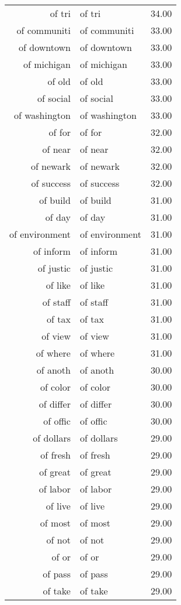 \begin{table}[ht]
\begin{tabular}{rlr}
  of tri & of tri & 34.00 \\ 
  of communiti & of communiti & 33.00 \\ 
  of downtown & of downtown & 33.00 \\ 
  of michigan & of michigan & 33.00 \\ 
  of old & of old & 33.00 \\ 
  of social & of social & 33.00 \\ 
  of washington & of washington & 33.00 \\ 
  of for & of for & 32.00 \\ 
  of near & of near & 32.00 \\ 
  of newark & of newark & 32.00 \\ 
  of success & of success & 32.00 \\ 
  of build & of build & 31.00 \\ 
  of day & of day & 31.00 \\ 
  of environment & of environment & 31.00 \\ 
  of inform & of inform & 31.00 \\ 
  of justic & of justic & 31.00 \\ 
  of like & of like & 31.00 \\ 
  of staff & of staff & 31.00 \\ 
  of tax & of tax & 31.00 \\ 
  of view & of view & 31.00 \\ 
  of where & of where & 31.00 \\ 
  of anoth & of anoth & 30.00 \\ 
  of color & of color & 30.00 \\ 
  of differ & of differ & 30.00 \\ 
  of offic & of offic & 30.00 \\ 
  of dollars & of dollars & 29.00 \\ 
  of fresh & of fresh & 29.00 \\ 
  of great & of great & 29.00 \\ 
  of labor & of labor & 29.00 \\ 
  of live & of live & 29.00 \\ 
  of most & of most & 29.00 \\ 
  of not & of not & 29.00 \\ 
  of or & of or & 29.00 \\ 
  of pass & of pass & 29.00 \\ 
  of take & of take & 29.00 \\ 

\end{tabular}
\end{table}
